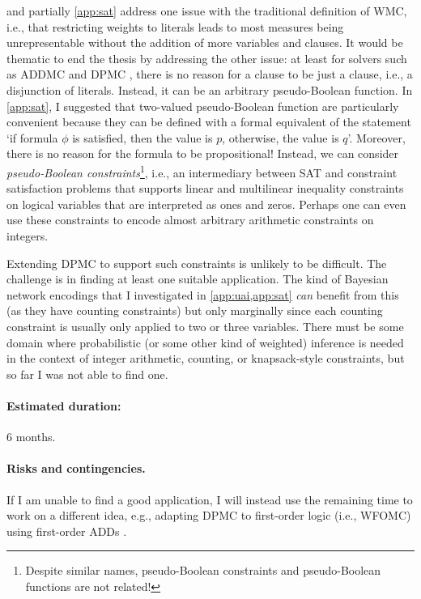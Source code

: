 \documentclass{article}
\begin{document}
 and partially \cref{app:sat} address one issue with the
traditional definition of WMC, i.e., that restricting weights to literals leads
to most measures being unrepresentable without the addition of more variables
and clauses. It would be thematic to end the thesis by addressing the other
issue: at least for solvers such as ADDMC \cite{DBLP:conf/aaai/DudekPV20} and
DPMC \cite{DBLP:conf/cp/DudekPV20}, there is no reason for a clause to be just a
clause, i.e., a disjunction of literals. Instead, it can be an arbitrary
pseudo-Boolean function. In \cref{app:sat}, I suggested that two-valued
pseudo-Boolean function are particularly convenient because they can be defined
with a formal equivalent of the statement `if formula $\phi$ is satisfied, then
the value is $p$, otherwise, the value is $q$'. Moreover, there is no reason for
the formula to be propositional! Instead, we can consider \emph{pseudo-Boolean
  constraints}\footnote{Despite similar names, pseudo-Boolean constraints and
  pseudo-Boolean functions are not related!}, i.e., an intermediary between SAT
and constraint satisfaction problems that supports linear and multilinear
inequality constraints on logical variables that are interpreted as ones and
zeros. Perhaps one can even use these constraints to encode almost arbitrary
arithmetic constraints on integers.

Extending DPMC to support such constraints is unlikely to be difficult. The
challenge is in finding at least one suitable application. The kind of Bayesian
network encodings that I investigated in \cref{app:uai,app:sat} \emph{can}
benefit from this (as they have counting constraints) but only marginally since
each counting constraint is usually only applied to two or three variables.
There must be some domain where probabilistic (or some other kind of weighted)
inference is needed in the context of integer arithmetic, counting, or
knapsack-style constraints, but so far I was not able to find one.

\paragraph{Estimated duration:} 6 months.

\paragraph{Risks and contingencies.} If I am unable to find a good
application, I will instead use the remaining time to work on a different idea,
e.g., adapting DPMC to first-order logic (i.e., WFOMC) using first-order ADDs
\cite{DBLP:journals/ai/SannerB09}.
\end{document}
